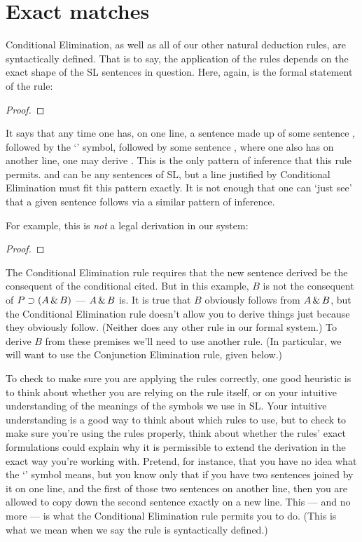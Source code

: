 \section{Exact matches}

Conditional Elimination, as well as all of our other natural deduction rules, are syntactically defined. That is to say, the application of the rules depends on the exact shape of the SL sentences in question. Here, again, is the formal statement of the rule:

\begin{proof}
	\metaA{}
	\metaB{} 
\end{proof}

It says that any time one has, on one line, a sentence made up of some sentence \metaA{}, followed by the `\eif' symbol, followed by some sentence \metaB{}, where one also has \metaA{} on another line, one may derive \metaB{}. This is the only pattern of inference that this rule permits. \metaA{} and \metaB{} can be any sentences of SL, but a line justified by Conditional Elimination must fit this pattern exactly. It is not enough that one can `just see' that a given sentence follows via a similar pattern of inference.

For example, this is \emph{not} a legal derivation in our system:

\begin{proof}
\end{proof}

The Conditional Elimination rule requires that the new sentence derived be the consequent of the conditional cited. But in this example, $B$ is not the consequent of $P\supset (A \,\&\, B)$ --- $A \,\&\, B$ is. It is true that $B$ obviously follows from $A \,\&\, B$, but the Conditional Elimination rule doesn't allow you to derive things just because they obviously follow. (Neither does any other rule in our formal system.) To derive $B$ from these premises we'll need to use another rule. (In particular, we will want to use the Conjunction Elimination rule, given below.)

To check to make sure you are applying the rules correctly, one good heuristic is to think about whether you are relying on the rule itself, or on your intuitive understanding of the meanings of the symbols we use in SL. Your intuitive understanding is a good way to think about which rules to use, but to check to make sure you're using the rules properly, think about whether the rules' exact formulations could explain why it is permissible to extend the derivation in the exact way you're working with. Pretend, for instance, that you have no idea what the `\eif' symbol means, but you know only that if you have two sentences joined by it on one line, and the first of those two sentences on another line, then you are allowed to copy down the second sentence exactly on a new line. This --- and no more --- is what the Conditional Elimination rule permits you to do. (This is what we mean when we say the rule is syntactically defined.)

